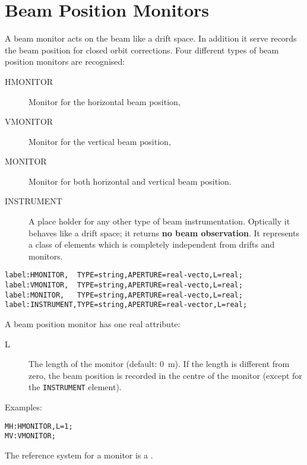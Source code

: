 \section{Beam Position Monitors}
\label{sec:monitors}
A beam monitor acts on the beam like a drift space.
In addition it serve records the beam position for closed orbit
corrections. 
Four different types of beam position monitors are recognised:
\begin{description}
\item[HMONITOR]
  \label{sec:hmonitor}
  Monitor for the horizontal beam position,
\item[VMONITOR]
  \label{sec:vmonitor}
  Monitor for the vertical beam position,
\item[MONITOR]
  \label{sec:monitor}
  Monitor for both horizontal and vertical beam position.
\item[INSTRUMENT]
  \label{sec:instrument}
  A place holder for any other type of beam instrumentation.
  Optically it behaves like a drift space;
  it returns \textbf{no beam observation}.
  It represents a class of elements
  which is completely independent from drifts and monitors.
\end{description}
\begin{verbatim}
label:HMONITOR,  TYPE=string,APERTURE=real-vecto,L=real;
label:VMONITOR,  TYPE=string,APERTURE=real-vecto,L=real;
label:MONITOR,   TYPE=string,APERTURE=real-vecto,L=real;
label:INSTRUMENT,TYPE=string,APERTURE=real-vector,L=real;
\end{verbatim}
A beam position monitor has one real attribute:
\begin{description}
\item[L]
  The length of the monitor (default: 0~m). 
  If the length is different from zero,
  the beam position is recorded in the centre of the monitor
  (except for the \texttt{INSTRUMENT} element).
\end{description}
\noindent Examples:
\begin{verbatim}
MH:HMONITOR,L=1;
MV:VMONITOR;
\end{verbatim}
The reference system for a monitor is a 
.
